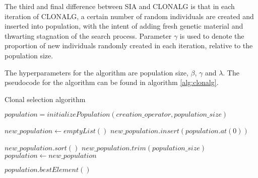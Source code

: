 The third and final difference between SIA and CLONALG is that in each iteration of CLONALG, a certain number of random individuals are created and inserted into population, with the intent of adding fresh genetic material and thwarting stagnation of the search process. Parameter $\gamma$ is used to denote the proportion of new individuals randomly created in each iteration, relative to the population size.

The hyperparameters for the algorithm are population size, $\beta$, $\gamma$ and $\lambda$. The pseudocode for the algorithm can be found in algorithm \ref{alg:clonalg}.

\begin{algorithm}[!htbp]
    \caption{Clonal selection algorithm}
    \label{alg:clonalg}

    $population = initializePopulation(creation\_operator, population\_size)$\;

     {

        $new\_population \gets emptyList()$\;
        $new\_population.insert(population.at(0))$\;



        $new\_population.sort()$\;
        $new\_population.trim(population\_size)$\;
        $population \gets new\_population$\;
    }

    \Return $population.bestElement()$\;
    \end{algorithm}